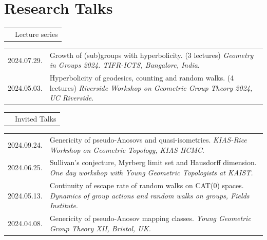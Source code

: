 \documentclass[a4paper, 10pt]{article}
\begin{document}
\section{Research Talks}


\vspace{8pt}
\begin{tabular}{Q{2.45cm}P{13cm}}
&{\large Lecture series}
\end{tabular}
\vspace{6pt}

\begin{tabular}{Q{2.45cm}P{13cm}}
\small{2024.07.29.} & Growth of (sub)groups with hyperbolicity. (3 lectures) \textit{Geometry in Groups 2024. TIFR-ICTS, Bangalore, India}.\\
\small{2024.05.03.} &Hyperbolicity of geodesics, counting and random walks. (4 lectures) \textit{Riverside Workshop on Geometric Group Theory 2024, UC Riverside}. \\
\end{tabular}

\vspace{8pt}
\begin{tabular}{Q{2.45cm}P{13cm}}
&{\large Invited Talks}
\end{tabular}
\vspace{6pt}

\begin{tabular}{Q{2.45cm}P{13cm}}


\small{2024.09.24.} & Genericity of pseudo-Anosovs and quasi-isometries. \textit{KIAS-Rice Workshop on Geometric Topology, KIAS HCMC}. \\
\small{2024.06.25.} &Sullivan’s conjecture, Myrberg limit set and Hausdorff dimension. \textit{One day workshop with Young Geometric Topologists at KAIST.}\\
\small{2024.05.13.} &  Continuity of escape rate of random walks on CAT(0) spaces. \textit{Dynamics of group actions and random walks on groups, Fields Institute}. \\
\small{2024.04.08.} & Genericity of pseudo-Anosov mapping classes. \textit{Young Geometric Group Theory XII, Bristol, UK.} \\\end{tabular}
\vspace{0.6cm}
\end{document}
